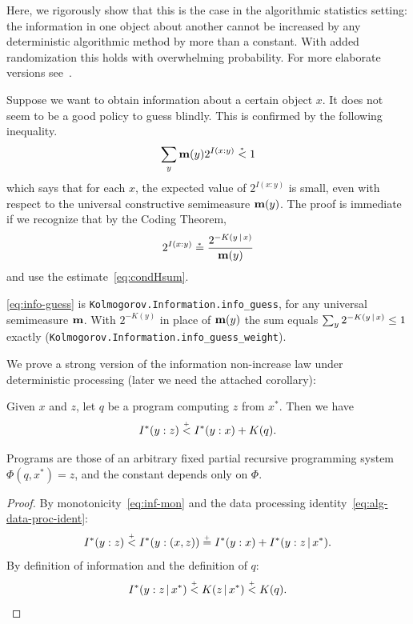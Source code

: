 Here, we rigorously show that this is the case in the algorithmic statistics
setting:
the information in one object about another
cannot be increased by any deterministic algorithmic method
by more than a constant. 
With added randomization this holds with overwhelming probability.
For more elaborate versions see~\cite{Levin74,LevinRandCons84}.

Suppose we want to obtain information about a certain object \( x \). 
It does not seem to be a good policy to guess blindly. 
This is confirmed by the following inequality.
 \begin{equation}\label{eq:info-guess}
	\sum_y \mathbf{m}(y)2^{I(x : y)} \stackrel{{}_*}{<} 1 
 \end{equation}
  which says that for each \( x \), the expected value of \( 2^{I(x : y)} \) is 
small, even with respect to the universal constructive semimeasure 
\( \mathbf{m}(y) \). 
The proof is immediate if we recognize that by the Coding 
Theorem, 
 \[	2^{I(x : y)} \stackrel{{}_*}{=} \frac{2^{-K(y \,\vert\, x)}}{\mathbf{m}(y)}
 \]
  and use the estimate~\eqref{eq:condHsum}.

\begin{formalization}
\eqref{eq:info-guess} is \texttt{Kolmogorov.Information.info\_guess}, for any universal
semimeasure \( \mathbf{m} \). With \( 2^{-K(y)} \) in place of \( \mathbf{m}(y) \) the sum equals
\( \sum_{y} 2^{-K(y \,\vert\, x)} \le 1 \) exactly
(\texttt{Kolmogorov.Information.info\_guess\_weight}).
\end{formalization}

We prove a strong version of the information non-increase law
under deterministic processing (later we need the attached corollary):

\begin{theorem}
  \label{thm:g3.1.11}
  \leanok
Given \( x \) and \( z \), let \( q \) be a program computing \( z \) from \( x^{*} \).
Then we have
 \begin{equation*}
   I^{*}(y : z) \stackrel{{}_+}{<} I^{*}(y : x) + K(q).
 \end{equation*}
\end{theorem}

\begin{formalization}
Programs are those of an arbitrary fixed partial recursive programming system
\( \Phi(q, x^{*}) = z \), and the constant depends only on \( \Phi \).
\end{formalization}

\begin{proof}
  \leanok
By monotonicity~\eqref{eq:inf-mon} and
the data processing identity~\eqref{eq:alg-data-proc-ident}:
\[
 I^{*}(y : z) \stackrel{{}_+}{<}
I^{*}(y : (x, z)) \stackrel{{}_+}{=} I^{*}(y : x) + I^{*}(y : z \,\vert\, x^{*}).   
\]
By definition of information and the definition of \( q \):
 \[
   I^{*}(y : z \,\vert\, x^{*}) \stackrel{{}_+}{<} K(z \,\vert\, x^{*}) \stackrel{{}_+}{<} K(q).
 \]
\end{proof}

